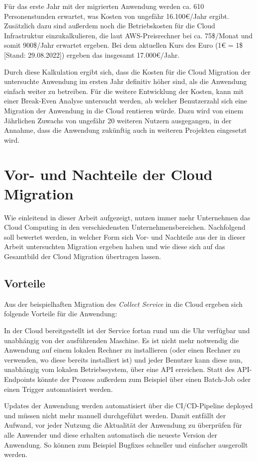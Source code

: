 Für das erste Jahr mit der migrierten Anwendung werden ca. 610 Personenstunden erwartet, was Kosten von ungefähr 16.100€/Jahr ergibt. Zusätzlich dazu sind außerdem noch die Betriebskosten für die Cloud Infrastruktur einzukalkulieren, die laut \ac{AWS}-Preisrechner bei ca. 75\$/Monat und somit 900\$/Jahr erwartet ergeben. Bei dem aktuellen Kurs des Euro (1€ = 1\$ [Stand: 29.08.2022]) ergeben das insgesamt 17.000€/Jahr.

Durch diese Kalkulation ergibt sich, dass die Kosten für die Cloud Migration der untersuchte Anwendung im ersten Jahr definitiv höher sind, als die Anwendung einfach weiter zu betreiben. Für die  weitere Entwicklung der Kosten, kann mit einer Break-Even Analyse untersucht werden, ab welcher Benutzerzahl sich eine Migration der Anwendung in die Cloud rentieren würde. Dazu wird von einem Jährlichen Zuwachs von ungefähr 20 weiteren Nutzern ausgegangen, in der Annahme, dass die Anwendung zukünftig auch in weiteren Projekten eingesetzt wird.
\pagebreak

\section{Vor- und Nachteile der Cloud Migration}
Wie einleitend in dieser Arbeit aufgezeigt, nutzen immer mehr Unternehmen das Cloud Computing in den verschiedensten Unternehmensbereichen. Nachfolgend soll bewertet werden, in welcher Form sich Vor- und Nachteile aus der in dieser Arbeit untersuchten Migration ergeben haben und wie diese sich auf das Gesamtbild der Cloud Migration übertragen lassen.

\subsection{Vorteile}
Aus der beispielhaften Migration des \textit{Collect Service} in die Cloud ergeben sich folgende Vorteile für die Anwendung:

In der Cloud bereitgestellt ist der Service fortan rund um die Uhr verfügbar und unabhängig von der ausführenden Maschine. Es ist nicht mehr notwendig die Anwendung auf einem lokalen Rechner zu installieren (oder einen Rechner zu verwenden, wo diese bereits installiert ist) und jeder Benutzer kann diese nun, unabhängig vom lokalen Betriebssystem, über eine \ac{API} erreichen. Statt des \ac{API}-Endpoints könnte der Prozess außerdem zum Beispiel über einen Batch-Job oder einen Trigger automatisiert werden.

Updates der Anwendung werden automatisiert über die \ac{CI/CD}-Pipeline deployed und müssen nicht mehr manuell durchgeführt werden. Damit entfällt der Aufwand, vor jeder Nutzung die Aktualität der Anwendung zu überprüfen für alle Anwender und diese erhalten automatisch die neueste Version der Anwendung. So können zum Beispiel Bugfixes schneller und einfacher ausgerollt werden. 

